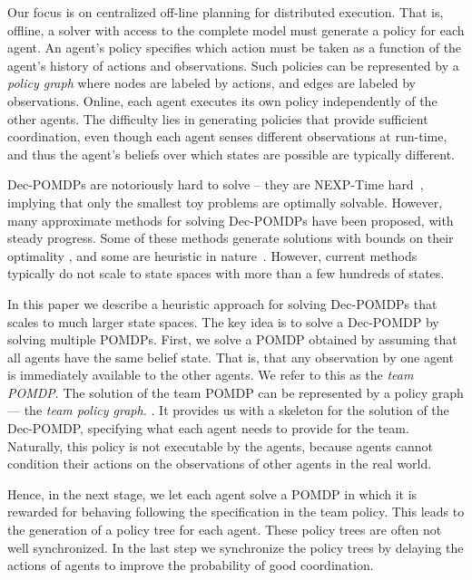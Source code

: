 \documentclass[letterpaper]{article} %
\theoremstyle{definition}
\begin{document}
Our focus is on centralized off-line planning for distributed execution. That is, offline, a solver with access to the complete model must generate a policy for each agent. An agent's policy specifies which action must be taken as a function of the agent's history of
actions and observations. Such policies can be represented by a {\em policy graph} where nodes are labeled by actions, and edges are labeled by observations. Online, each agent executes its own policy independently of the other agents.
The difficulty lies in generating policies that provide sufficient coordination, even though each agent senses different observations at run-time, and thus the agent's beliefs over which states are possible are typically different. 

Dec-POMDPs are notoriously hard to solve -- they are NEXP-Time hard~\cite{DECPOMDPCOMP}, implying that only the smallest toy problems are optimally solvable.
However, many approximate methods for solving Dec-POMDPs have been proposed, with steady progress. Some of these methods generate solutions with bounds on
their optimality \cite{GMAAICE,MBDP,DICEPS}, and some are heuristic in nature~\cite{JESP}. However, current methods typically do not scale to state spaces with more than a few hundreds of states.


In this paper we describe a heuristic approach for solving Dec-POMDPs that scales to much larger state spaces. The key idea is to solve a Dec-POMDP by
solving multiple POMDPs. First, we solve a POMDP obtained by assuming that all agents have the same belief state. That is, that any observation by one agent is immediately available to the other agents. We refer to this as the {\em team POMDP}. The solution of the team
POMDP can be represented by a policy graph --- the {\em team policy graph.} . It provides us with a skeleton for the solution of the Dec-POMDP, specifying what each agent needs to provide for the team. Naturally, this policy is not executable by the agents, because agents cannot condition their actions on the observations of other agents in the real world.

Hence, in the next stage, we let each agent solve a POMDP in which it is rewarded for behaving following the specification in the team policy. This leads to the generation of a policy tree for each agent. 
These policy trees are often not well synchronized. In the last step we synchronize the policy trees by delaying the actions of agents to improve the probability of good coordination. 
\end{document}

